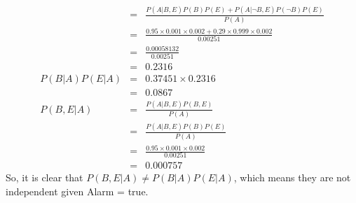 \documentclass{article}
\begin{document}
\begin{enumerate}[a.]
{\begin{eqnarray*}
& = & \frac{P(A|B,E)P(B)P(E)+P(A|\neg B,E)P(\neg B)P(E)}{P(A)} \\
& = & \frac{0.95\times 0.001\times 0.002 + 0.29\times 0.999\times
  0.002}{0.00251} \\ 
& = & \frac{0.00058132}{0.00251} \\
& = & 0.2316 \\
P(B|A)P(E|A) & = & 0.37451 \times 0.2316 \\
& = & 0.0867 \\
P(B,E|A) & = & \frac{P(A|B,E)P(B,E)}{P(A)} \\
& = & \frac{P(A|B,E)P(B)P(E)}{P(A)} \\
& = & \frac{0.95\times 0.001\times 0.002}{0.00251} \\ 
& = & 0.000757 
\end{eqnarray*}
So, it is clear that $P(B,E|A)\neq P(B|A)P(E|A)$, which means they are
not independent given Alarm = true. 
}
\end{enumerate}
\end{document}
